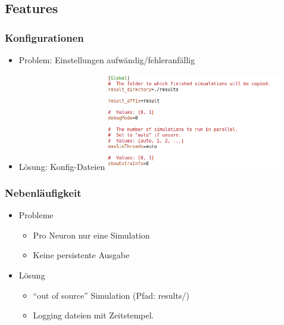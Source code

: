 \subsection{Features}

\begin{frame}
  \frametitle{Konfigurationen}
  \begin{itemize}
  \item Problem: Einstellungen aufwändig/fehleranfällig
  \item<2-> Lösung: Konfig-Dateien
    \includegraphics[width=0.6\textwidth]{config-example.png}
  \end{itemize}
\end{frame}

\begin{frame}
  \frametitle{Nebenläufigkeit}

  \begin{itemize}
  \item Probleme
    \begin{itemize}
    \item Pro Neuron nur eine Simulation
    \item Keine persistente Ausgabe
    \end{itemize}
  \item<2-> Lösung
    \begin{itemize}
    \item ``out of source'' Simulation (Pfad: results/)
    \item Logging dateien mit Zeitstempel.
    \end{itemize}

  \end{itemize}
\end{frame}
